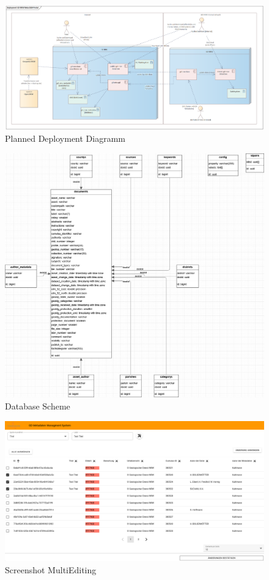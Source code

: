 \documentclass[11pt, titlepage, a4paper]{article}
\begin{document}
\begin{appendices}
    \begin{figure}[H]
        \caption{Planned Deployment Diagramm}
        \label{fig:deployment}
        \includegraphics[width=16cm]{deployment.png}
        \centering
    \end{figure}
    \begin{figure}[H]
        \caption{Database Scheme}
        \label{fig:db}
        \includegraphics[width=16cm]{db3.png}
        \centering
    \end{figure}
    \begin{figure}[H]
        \caption{Screenshot MultiEditing}
        \label{fig:multiedit}
        \includegraphics[width=16cm]{multiedit.png}

\end{figure}
\end{appendices}
\end{document}
